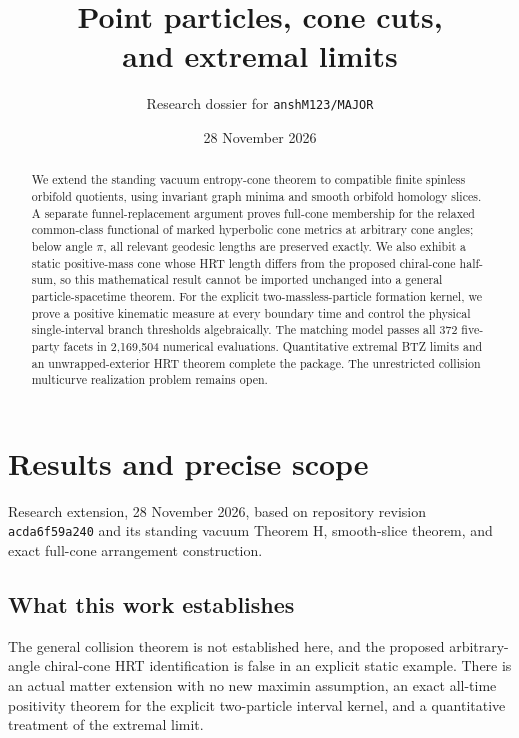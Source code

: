\documentclass[11pt]{article}
\title{\bfseries Point particles, cone cuts,\\and extremal limits}
\author{Research dossier for \texttt{anshM123/MAJOR}}
\date{28 November 2026}
\begin{document}
\maketitle
\thispagestyle{empty}
\begin{abstract}
We extend the standing vacuum entropy-cone theorem to compatible finite
spinless orbifold quotients, using invariant graph minima and smooth
orbifold homology slices. A separate funnel-replacement argument proves
full-cone membership for the relaxed common-class functional of marked
hyperbolic cone metrics at arbitrary cone angles; below angle \(\pi\),
all relevant geodesic lengths are preserved exactly. We also exhibit a
static positive-mass cone whose HRT length differs from the proposed
chiral-cone half-sum, so this mathematical result cannot be imported
unchanged into a general particle-spacetime theorem. For the explicit
two-massless-particle formation kernel, we prove a positive kinematic
measure at every boundary time and control the physical single-interval
branch thresholds algebraically. The matching model passes all 372
five-party facets in 2,169,504 numerical evaluations. Quantitative extremal
BTZ limits and an unwrapped-exterior HRT theorem complete the package.
The unrestricted collision multicurve realization problem remains open.
\end{abstract}
\vspace{6pt}
\tableofcontents
\clearpage

\section{Results and precise scope}\label{results-and-precise-scope}

Research extension, 28 November 2026, based on repository revision
\texttt{acda6f59a240} and its standing vacuum Theorem H, smooth-slice
theorem, and exact full-cone arrangement construction.

\subsection{What this work
establishes}\label{what-this-work-establishes}

The general collision theorem is not established here, and the proposed
arbitrary-angle chiral-cone HRT identification is false in an explicit
static example. There is an actual matter extension with no new maximin
assumption, an exact all-time positivity theorem for the explicit
two-particle interval kernel, and a quantitative treatment of the
extremal limit.
\end{document}
